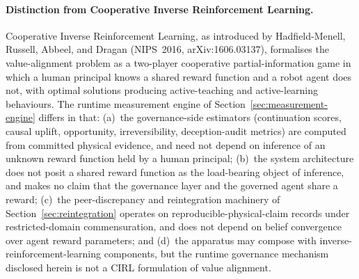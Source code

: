 \documentclass[a4paper,12pt]{article}
\begin{document}
\paragraph{Distinction from Cooperative Inverse Reinforcement
Learning.}
Cooperative Inverse Reinforcement Learning, as introduced by
Hadfield-Menell, Russell, Abbeel, and Dragan (NIPS~2016,
arXiv:1606.03137), formalises the value-alignment problem as a
two-player cooperative partial-information game in which a
human principal knows a shared reward function and a robot
agent does not, with optimal solutions producing
active-teaching and active-learning behaviours. The runtime
measurement engine of Section~\ref{sec:measurement-engine}
differs in that: (a)~the governance-side estimators
(continuation scores, causal uplift, opportunity,
irreversibility, deception-audit metrics) are computed from
committed physical evidence, and need not depend on inference
of an unknown reward function held by a human principal;
(b)~the system architecture does not posit a shared reward
function as the load-bearing object of inference, and makes no
claim that the governance layer and the governed agent share a
reward; (c)~the peer-discrepancy and reintegration machinery of
Section~\ref{sec:reintegration} operates on
reproducible-physical-claim records under restricted-domain
commensuration, and does not depend on belief convergence over
agent reward parameters; and (d)~the apparatus may compose with
inverse-reinforcement-learning components, but the runtime
governance mechanism disclosed herein is not a CIRL formulation
of value alignment.
\end{document}
